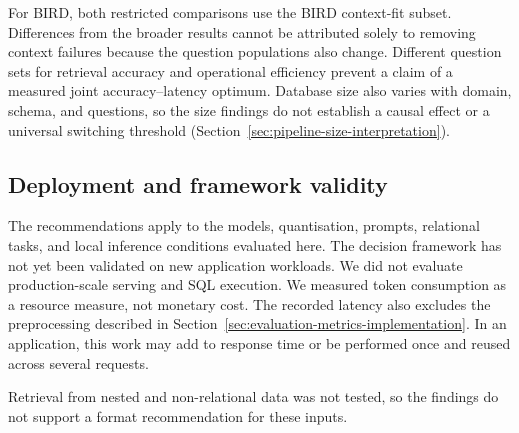 For BIRD, both restricted comparisons use the BIRD context-fit subset. Differences from the broader results
cannot be attributed solely to removing context failures because the question populations also change.
Different question sets for retrieval accuracy and operational efficiency prevent a claim of a measured joint
accuracy--latency optimum. Database size also varies with domain, schema, and questions, so the size findings
do not establish a causal effect or a universal switching threshold
(Section~\ref{sec:pipeline-size-interpretation}).

\subsection{Deployment and framework validity}

The recommendations apply to the models, quantisation, prompts, relational tasks, and local inference
conditions evaluated here. The decision framework has not yet been validated on new application workloads. We did
not evaluate production-scale serving and SQL execution.
We measured token consumption as a resource measure, not monetary cost.
The recorded latency also excludes the preprocessing described in Section~\ref{sec:evaluation-metrics-implementation}.
In an application, this work may add to response time or be performed once and reused across several requests.

Retrieval from nested and non-relational data was not tested, so the findings do not support a format
recommendation for these inputs.
